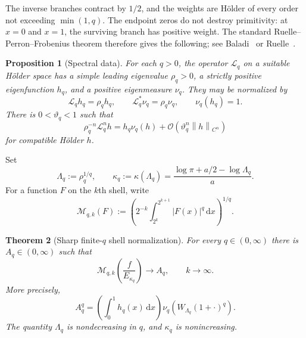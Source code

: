 \documentclass[11pt,oneside]{article}
\newtheorem{theorem}{Theorem}[section]
\newtheorem{proposition}[theorem]{Proposition}
\theoremstyle{definition}
\theoremstyle{remark}
\newcommand{\dd}{\,\mathrm d}
\newcommand{\bigO}{\mathcal O}
\newcommand{\Lop}{\mathcal L}
\newcommand{\norm}[1]{\left\lVert#1\right\rVert}
\begin{document}
The inverse branches contract by $1/2$, and the weights are H\"older of every
order not exceeding $\min(1,q)$.  The endpoint zeros do not destroy
primitivity: at $x=0$ and $x=1$, the surviving branch has positive weight.
The standard Ruelle--Perron--Frobenius theorem therefore gives the following;
see Baladi~\cite{baladi} or Ruelle~\cite{ruelle}.

\begin{proposition}[Spectral data]
\label{prop:RPF}
For each $q>0$, the operator $\Lop_q$ on a suitable H\"older space has a
simple leading eigenvalue $\rho_q>0$, a strictly positive eigenfunction $h_q$,
and a positive eigenmeasure $\nu_q$.  They may be normalized by
\begin{equation}
 \Lop_qh_q=\rho_qh_q,
 \qquad
 \Lop_q^*\nu_q=\rho_q\nu_q,
 \qquad
 \nu_q(h_q)=1.
 \label{eq:RPF-normalization}
\end{equation}
There is $0<\vartheta_q<1$ such that
\begin{equation}
 \rho_q^{-n}\Lop_q^nh
 =h_q\nu_q(h)+\bigO(\vartheta_q^n\norm h_{C^\alpha})
 \label{eq:RPF-gap}
\end{equation}
for compatible H\"older $h$.
\end{proposition}

Set
\begin{equation}
 \Lambda_q:=\rho_q^{1/q},
 \qquad
 \kappa_q:=\kappa(\Lambda_q)
 =\frac{\log\pi+a/2-\log\Lambda_q}{a}.
 \label{eq:kappa-q}
\end{equation}
For a function $F$ on the $k$th shell, write
\begin{equation}
 \mathcal M_{q,k}(F):=
 \left(2^{-k}\int_{2^k}^{2^{k+1}}|F(x)|^q\dd x\right)^{1/q}.
 \label{eq:shell-Lq}
\end{equation}

\begin{theorem}[Sharp finite-$q$ shell normalization]
\label{thm:Lq-spectrum}
For every $q\in(0,\infty)$ there is $A_q\in(0,\infty)$ such that
\begin{equation}
 \mathcal M_{q,k}\!\left(\frac{f}{E_{\kappa_q}}\right)
 \longrightarrow A_q,
 \qquad k\to\infty.
 \label{eq:Lq-limit}
\end{equation}
More precisely,
\begin{equation}
 A_q^q=
 \left(\int_0^1h_q(x)\dd x\right)
 \nu_q\!\left(W_{\Lambda_q}(1+\cdot)^q\right).
 \label{eq:Aq}
\end{equation}
The quantity $\Lambda_q$ is nondecreasing in $q$, and $\kappa_q$ is
nonincreasing.
\end{theorem}
\end{document}
